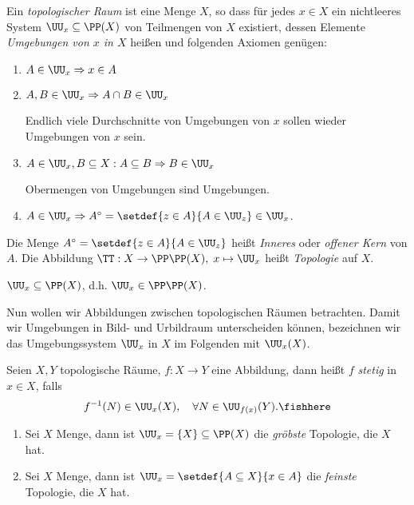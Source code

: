\begin{defn}
\label{defn:0.3.1}
Ein \emph{topologischer Raum} ist eine Menge $X$, so dass für jedes $x\in X$ ein
nichtleeres System $\UU_x \subseteq \PP(X)$ von Teilmengen von $X$ existiert,
dessen Elemente \emph{Umgebungen von $x$ in $X$} heißen und folgenden Axiomen
genügen:
\begin{enumerate}
  \item $A\in \UU_x \Rightarrow x\in A$
  \item $A,B\in \UU_x \Rightarrow A\cap B \in \UU_x$
  
Endlich viele Durchschnitte von Umgebungen von $x$ sollen wieder Umgebungen von
$x$ sein.
  \item $A\in \UU_x, B\subseteq X : A\subseteq B \Rightarrow B\in \UU_x$
  
  Obermengen von Umgebungen sind Umgebungen.
  \item $A\in \UU_x \Rightarrow A^\circ = \setdef{z\in A}{A\in \UU_z}\in \UU_x$.
\end{enumerate}

Die Menge $A^\circ = \setdef{z\in A}{A\in \UU_z}$ heißt \emph{Inneres} oder
\emph{offener Kern} von $A$. Die Abbildung $\TT: X\to \PP\PP(X),\;x\mapsto
\UU_x$ heißt \emph{Topologie} auf $X$.\fishhere
\end{defn}

\begin{bemn}
$\UU_x\subseteq \PP(X)$, d.h. $\UU_x\in \PP\PP(X)$.\maphere
\end{bemn}

Nun wollen wir Abbildungen zwischen topologischen Räumen betrachten. Damit wir
Umgebungen in Bild- und Urbildraum unterscheiden können, bezeichnen wir das
Umgebungssystem $\UU_x$ in $X$ im Folgenden mit $\UU_x(X)$.

\begin{defn}
\label{defn:0.3.2}
Seien $X,Y$ topologische Räume, $f: X\to Y$ eine Abbildung, dann heißt $f$
\emph{stetig} in $x\in X$, falls
\begin{align*}
f^{-1}(N)\in \UU_x(X),\quad \forall N\in \UU_{f(x)}(Y).\fishhere
\end{align*}
\end{defn}

\begin{bsp}
\label{bsp:0.3.3}
\begin{enumerate}
  \item Sei $X$ Menge, dann ist $\UU_x = \{X\}\subseteq \PP(X)$ die
  \emph{gröbste} Topologie, die $X$ hat.
  \item Sei $X$ Menge, dann ist $\UU_x = \setdef{A\subseteq X}{x\in A}$ die
  \emph{feinste} Topologie, die $X$ hat.\bsphere
\end{enumerate}
\end{bsp}

